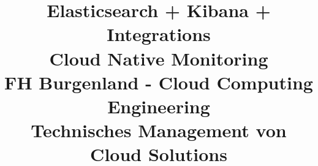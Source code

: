 \title{Elasticsearch + Kibana + Integrations \\
	
	\large{Cloud Native Monitoring} \\
			\large{FH Burgenland - Cloud Computing Engineering \\
			Technisches Management von Cloud Solutions}
		}